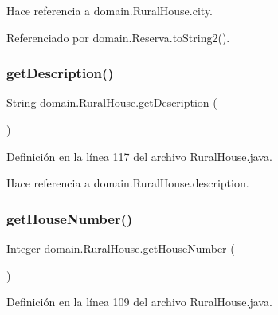 Hace referencia a domain.\+Rural\+House.\+city.



Referenciado por domain.\+Reserva.\+to\+String2().

\mbox{\label{classdomain_1_1_rural_house_a21b3359aa62984046a4da490fe8895e1}} 
\subsubsection{\texorpdfstring{getDescription()}{getDescription()}}
{\footnotesize\ttfamily String domain.\+Rural\+House.\+get\+Description (\begin{DoxyParamCaption}{ }\end{DoxyParamCaption})}



Definición en la línea 117 del archivo Rural\+House.\+java.


\begin{DoxyCode}{0}

\end{DoxyCode}


Hace referencia a domain.\+Rural\+House.\+description.

\mbox{\label{classdomain_1_1_rural_house_a849faba68dc8c0a71ed936bc509f5568}} 
\subsubsection{\texorpdfstring{getHouseNumber()}{getHouseNumber()}}
{\footnotesize\ttfamily Integer domain.\+Rural\+House.\+get\+House\+Number (\begin{DoxyParamCaption}{ }\end{DoxyParamCaption})}



Definición en la línea 109 del archivo Rural\+House.\+java.


